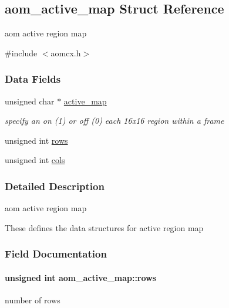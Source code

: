 \hypertarget{structaom__active__map}{}\subsection{aom\+\_\+active\+\_\+map Struct Reference}
\label{structaom__active__map}


aom active region map  




{\ttfamily \#include $<$aomcx.\+h$>$}

\subsubsection*{Data Fields}
\begin{DoxyCompactItemize}
\item 
unsigned char $\ast$ \hyperlink{structaom__active__map_a8916917bce716b1d954a9f476d98142e}{active\+\_\+map}\hypertarget{structaom__active__map_a8916917bce716b1d954a9f476d98142e}{}\label{structaom__active__map_a8916917bce716b1d954a9f476d98142e}

\begin{DoxyCompactList}\small\item\em specify an on (1) or off (0) each 16x16 region within a frame \end{DoxyCompactList}\item 
unsigned int \hyperlink{structaom__active__map_a0d7ce0e1050137bf9b88e8649ea7aec2}{rows}
\item 
unsigned int \hyperlink{structaom__active__map_a3a105e0d8f2643cdc542e2f078b9e6b2}{cols}
\end{DoxyCompactItemize}


\subsubsection{Detailed Description}
aom active region map 

These defines the data structures for active region map 

\subsubsection{Field Documentation}
\paragraph[{\texorpdfstring{rows}{rows}}]{\setlength{\rightskip}{0pt plus 5cm}unsigned int aom\+\_\+active\+\_\+map\+::rows}\hypertarget{structaom__active__map_a0d7ce0e1050137bf9b88e8649ea7aec2}{}\label{structaom__active__map_a0d7ce0e1050137bf9b88e8649ea7aec2}
number of rows 
